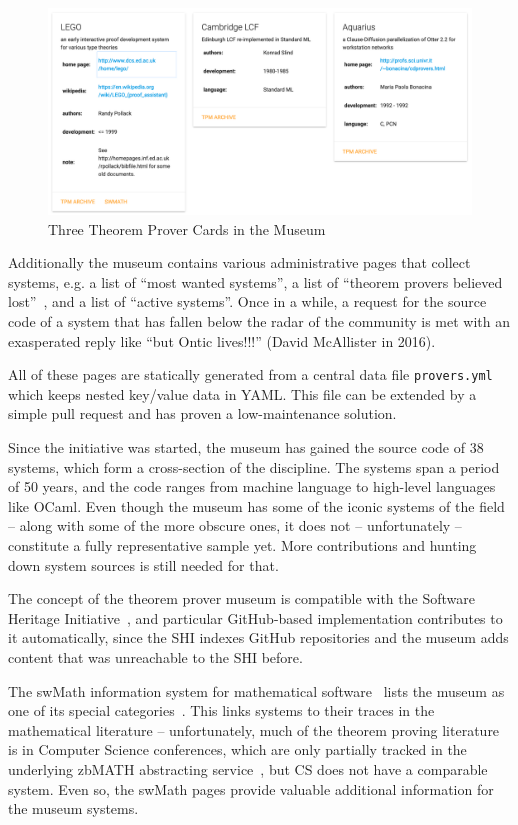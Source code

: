\documentclass{article}
\begin{document}
\begin{figure}[ht]\centering
  \includegraphics[width=\textwidth]{cards.png}
  \caption{Three Theorem Prover Cards in the Museum}\label{fig:cards}
\end{figure}

Additionally the museum contains various administrative pages that collect systems, e.g. a
list of ``most wanted systems'', a list of ``theorem provers believed
lost''~\cite{tpmuseum:tpbl:on}, and a list of ``active systems''. Once in a while, a
request for the source code of a system that has fallen below the radar of the community
is met with an exasperated reply like ``but Ontic lives!!!'' (David McAllister in
2016).

All of these pages are statically generated from a central data
file \texttt{provers.yml} \cite{tpmuseum:data:on} which keeps nested key/value data in
YAML. This file can be extended by a simple pull request and has proven a low-maintenance
solution. 
    
Since the initiative was started, the museum has gained the source code of 38 systems,
which form a cross-section of the discipline. The systems span a period of 50 years, and
the code ranges from machine language to high-level languages like OCaml. Even though the
museum has some of the iconic systems of the field -- along with some of the more obscure
ones, it does not -- unfortunately -- constitute a fully representative sample yet. More
contributions and hunting down system sources is still needed for that.

The concept of the theorem prover museum is compatible with the Software Heritage
Initiative~\cite{SoftwareHeritage:on}, and particular GitHub-based implementation
contributes to it automatically, since the SHI indexes GitHub repositories and the museum
adds content that was unreachable to the SHI before. 


The \textsf{swMath} information system for mathematical software~\cite{swMath:on} lists
the museum as one of its special categories~\cite{swMath:tpmuseum:on}. This links systems
to their traces in the mathematical literature -- unfortunately, much of the theorem
proving literature is in Computer Science conferences, which are only partially tracked in
the underlying \textsf{zbMATH} abstracting service~\cite{zbMATH:on}, but CS does not have
a comparable system. Even so, the \textsf{swMath} pages provide valuable additional
information for the museum systems. 
\end{document}
